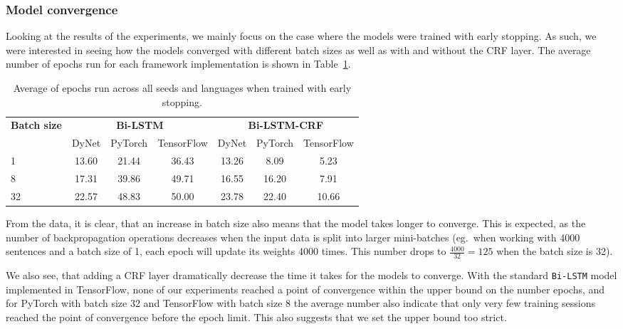 \subsubsection{Model convergence}

Looking at the results of the experiments, we mainly focus on the case where the
models were trained with early stopping. As such, we were
interested in seeing how the models converged with different batch sizes as well
as with and without the CRF layer. The average number of epochs run for each
framework implementation is shown in Table~\ref{table:epochs-run-pos}.

\begin{table}[h!]
    \centering
    \begin{tabular}{l c c c|c c c}
        \toprule
        \multirow{2}{*}{\bfseries Batch size}     &
        \multicolumn{3}{c}{\bfseries Bi-LSTM}     &
        \multicolumn{3}{c}{\bfseries Bi-LSTM-CRF} \\
        \cmidrule(lr){2-7}
        & DyNet & PyTorch & TensorFlow
        & DyNet & PyTorch & TensorFlow \\
        \cmidrule(lr){1-7}
         1 & 13.60 & 21.44 & 36.43 & 13.26 &  8.09 &  5.23 \\
         8 & 17.31 & 39.86 & 49.71 & 16.55 & 16.20 &  7.91 \\
        32 & 22.57 & 48.83 & 50.00 & 23.78 & 22.40 & 10.66 \\
        \bottomrule
    \end{tabular}
    \caption{Average of epochs run across all seeds and languages when trained
        with early stopping.
    }\label{table:epochs-run-pos}
\end{table}

From the data, it is clear, that an increase in batch size also means that the
model takes longer to converge. This is expected, as the number of
backpropagation operations decreases when the input data is split into larger
mini-batches (eg.\ when working with 4000 sentences and a batch size of 1, each
epoch will update its weights 4000 times. This number drops to
$\frac{4000}{32}=125$ when the batch size is 32).

We also see, that adding a CRF layer dramatically decrease the time it takes for
the models to converge. With the standard \texttt{Bi-LSTM} model implemented in
TensorFlow, none of our experiments reached a point of convergence within the
upper bound on the number epochs, and for PyTorch with batch size 32 and
TensorFlow with batch size 8 the average number also indicate that only very few
training sessions reached the point of convergence before the epoch limit. This
also suggests that we set the upper bound too strict.

